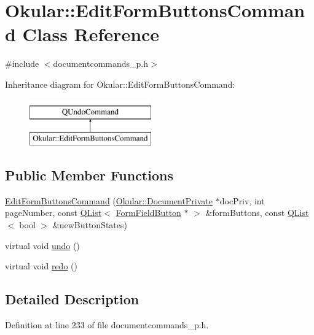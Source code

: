 \hypertarget{classOkular_1_1EditFormButtonsCommand}{\section{Okular\+:\+:Edit\+Form\+Buttons\+Command Class Reference}
\label{classOkular_1_1EditFormButtonsCommand}
}


{\ttfamily \#include $<$documentcommands\+\_\+p.\+h$>$}

Inheritance diagram for Okular\+:\+:Edit\+Form\+Buttons\+Command\+:\begin{figure}[H]
\begin{center}
\leavevmode
\includegraphics[height=2.000000cm]{classOkular_1_1EditFormButtonsCommand}
\end{center}
\end{figure}
\subsection*{Public Member Functions}
\begin{DoxyCompactItemize}
\item 
\hyperlink{classOkular_1_1EditFormButtonsCommand_af9243ad3304826f2252e5dd7fda5aa5e}{Edit\+Form\+Buttons\+Command} (\hyperlink{classOkular_1_1DocumentPrivate}{Okular\+::\+Document\+Private} $\ast$doc\+Priv, int page\+Number, const \hyperlink{classQList}{Q\+List}$<$ \hyperlink{classOkular_1_1FormFieldButton}{Form\+Field\+Button} $\ast$ $>$ \&form\+Buttons, const \hyperlink{classQList}{Q\+List}$<$ bool $>$ \&new\+Button\+States)
\item 
virtual void \hyperlink{classOkular_1_1EditFormButtonsCommand_acadb93f2212b11379ce083e99638fa25}{undo} ()
\item 
virtual void \hyperlink{classOkular_1_1EditFormButtonsCommand_a95a2e67859c8dd50e6655f5fc3827f3e}{redo} ()
\end{DoxyCompactItemize}


\subsection{Detailed Description}


Definition at line 233 of file documentcommands\+\_\+p.\+h.



